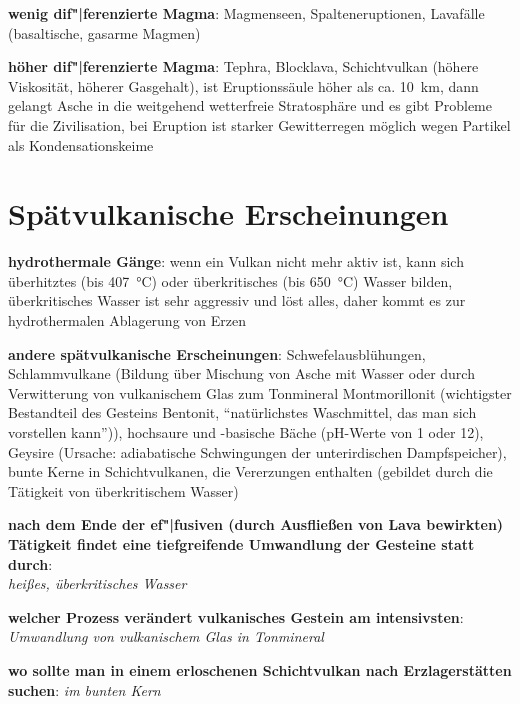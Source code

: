 \textbf{wenig dif"|ferenzierte Magma}:
Magmenseen, Spalteneruptionen, Lavafälle
(basaltische, gasarme Magmen)

\textbf{höher dif"|ferenzierte Magma}:
Tephra, Blocklava, Schichtvulkan
(höhere Viskosität, höherer Gasgehalt),
ist Eruptionssäule höher als ca. \SI{10}{\kilo\meter}, dann gelangt Asche in
die weitgehend wetterfreie Stratosphäre und es gibt Probleme für die Zivilisation,
bei Eruption ist starker Gewitterregen möglich wegen Partikel als Kondensationskeime

\section{%
    Spätvulkanische Erscheinungen%
}

\textbf{hydrothermale Gänge}:
wenn ein Vulkan nicht mehr aktiv ist,
kann sich überhitztes (bis \SI{407}{\celsius}) oder überkritisches (bis \SI{650}{\celsius})
Wasser bilden,
überkritisches Wasser ist sehr aggressiv und löst alles,
daher kommt es zur hydrothermalen Ablagerung von Erzen

\textbf{andere spätvulkanische Erscheinungen}:
Schwefelausblühungen,
Schlammvulkane
(Bildung über Mischung von Asche mit Wasser oder
durch Verwitterung von vulkanischem Glas zum Tonmineral Montmorillonit
(wichtigster Bestandteil des Gesteins Bentonit,
"`natürlichstes Waschmittel, das man sich vorstellen kann"')),
hochsaure und -basische Bäche (pH-Werte von 1 oder 12),
Geysire (Ursache: adiabatische Schwingungen der unterirdischen Dampfspeicher),
bunte Kerne in Schichtvulkanen, die Vererzungen enthalten
(gebildet durch die Tätigkeit von überkritischem Wasser)

\begin{wichtig}
    \item
    \textbf{nach dem Ende der ef"|fusiven (durch Ausfließen von Lava bewirkten) Tätigkeit findet
    eine tiefgreifende Umwandlung der Gesteine statt durch}:\\
    \emph{heißes, überkritisches Wasser}

    \item
    \textbf{welcher Prozess verändert vulkanisches Gestein am intensivsten}:\\
    \emph{Umwandlung von vulkanischem Glas in Tonmineral}

    \item
    \textbf{wo sollte man in einem erloschenen Schichtvulkan nach Erzlagerstätten suchen}:
    \emph{im bunten Kern}
\end{wichtig}

